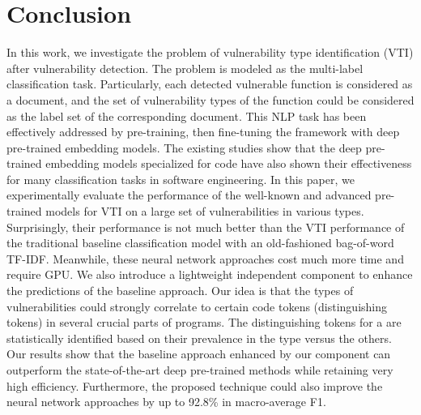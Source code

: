 \section{Conclusion}
\label{sec:conclusion}
In this work, we investigate the problem of vulnerability type identification (VTI) after vulnerability detection. The problem is modeled as the multi-label classification task. Particularly, each detected vulnerable function is considered as a document, and the set of vulnerability types of the function could be considered as the label set of the corresponding document.
%
This NLP task has been effectively addressed by pre-training, then fine-tuning the framework with deep pre-trained embedding models. 
%
The existing studies show that the deep pre-trained embedding models specialized for code have also shown their effectiveness for many classification tasks in software engineering.
%
In this paper, we experimentally evaluate the performance of the well-known and advanced pre-trained models for VTI on a large set of vulnerabilities in various types. Surprisingly, their performance is not much better than the VTI performance of the traditional baseline classification model with an old-fashioned bag-of-word TF-IDF. Meanwhile, these neural network approaches cost much more time and require GPU. We also introduce a lightweight independent component to enhance the predictions of the baseline approach. Our idea is that the types of vulnerabilities could strongly correlate to certain code tokens (distinguishing tokens) in several crucial parts of programs. The distinguishing tokens for a \vt are statistically identified based on their prevalence in the type versus the others. Our results show that the baseline approach enhanced by our component can outperform the state-of-the-art deep pre-trained methods while retaining very high efficiency. Furthermore, the proposed technique could also improve the neural network approaches by up to 92.8\% in macro-average F1.